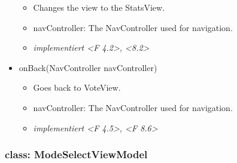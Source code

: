 \documentclass[oneside, ngerman]{sdqtechreport}
\begin{document}
\begin{itemize}
        \begin{itemize}
            \item Changes the view to the StatsView.
            \item navController: The NavController used for navigation.
            \item \textit{implementiert <F 4.2>, <8.2>}
        \end{itemize}
    \item onBack(NavController navController)
        \begin{itemize}
            \item Goes back to VoteView.
            \item navController: The NavController used for navigation.
            \item \textit{implementiert <F 4.5>, <F 8.6>}
        \end{itemize}
\end{itemize}



\subsubsection{class: ModeSelectViewModel}
\end{document}
